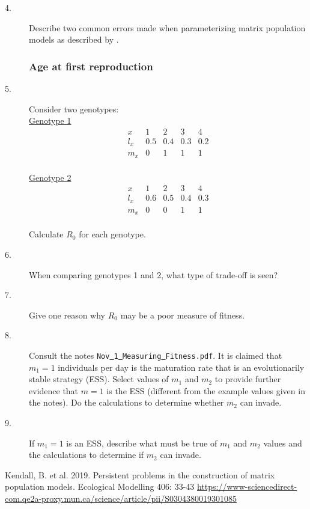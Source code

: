 \documentclass[11pt, oneside]{article}   	%
\begin{document}
\begin{description}
 \item[4.] Describe two common errors made when parameterizing matrix population models as described by \cite{Kendall}.
 
 \subsubsection*{Age at first reproduction}
  \item[5.] Consider two genotypes:\\
  \underline{Genotype 1}\\
  \[
  \begin{array}{ccccc}
  x & 1 & 2 & 3 & 4\\
  l_x & 0.5 & 0.4 & 0.3 & 0.2\\
  m_x & 0& 1 & 1& 1\\
  \end{array}
  \]

  \underline{Genotype 2} \\
  \[
  \begin{array}{ccccc}
  x & 1 & 2 & 3 & 4\\
  l_x & 0.6 & 0.5 & 0.4 & 0.3\\
  m_x & 0& 0 & 1 & 1\\
  \end{array}
\]

Calculate $R_0$ for each genotype.

\item[6.] When comparing genotypes 1 and 2, what type of trade-off is seen?
\item[7.] Give one reason why $R_0$ may be a poor measure of fitness.
\item[8.] Consult the notes \texttt{Nov\underline{ }1\underline{ }Measuring\underline{ }Fitness.pdf}. It is claimed that $m_1 = 1$ individuals per day is the maturation rate that is an evolutionarily stable strategy (ESS). Select values of $m_1$ and $m_2$ to provide further evidence that $m=1$ is the ESS (different from the example values given in the notes). Do the calculations to determine whether $m_2$ can invade.
\item[9.] If $m_1 = 1$ is an ESS, describe what must be true of $m_1$ and $m_2$ values and the calculations to determine if $m_2$ can invade. 
\end{description}

\begin{thebibliography}{10}
 Kendall, B. et al. 2019. Persistent problems in the construction of matrix population models.  Ecological Modelling 406: 33-43 \url{https://www-sciencedirect-com.qe2a-proxy.mun.ca/science/article/pii/S0304380019301085}
\end{thebibliography}
\end{document}
